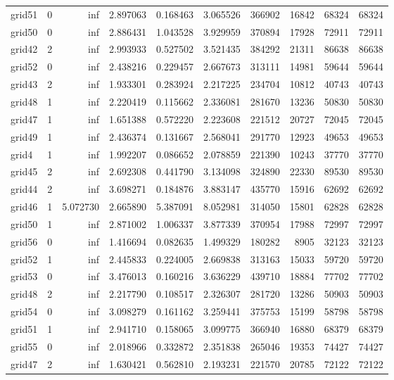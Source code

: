 \documentclass[../../../thesis.tex]{subfiles}
\begin{document}
\begin{longtable}{|l|r|r|r|r|r|r|r|r|r|}
grid51 & 0 & inf & 2.897063 & 0.168463 & 3.065526 & 366902 & 16842 & 68324 & 68324 \\
grid50 & 0 & inf & 2.886431 & 1.043528 & 3.929959 & 370894 & 17928 & 72911 & 72911 \\
grid42 & 2 & inf & 2.993933 & 0.527502 & 3.521435 & 384292 & 21311 & 86638 & 86638 \\
grid52 & 0 & inf & 2.438216 & 0.229457 & 2.667673 & 313111 & 14981 & 59644 & 59644 \\
grid43 & 2 & inf & 1.933301 & 0.283924 & 2.217225 & 234704 & 10812 & 40743 & 40743 \\
grid48 & 1 & inf & 2.220419 & 0.115662 & 2.336081 & 281670 & 13236 & 50830 & 50830 \\
grid47 & 1 & inf & 1.651388 & 0.572220 & 2.223608 & 221512 & 20727 & 72045 & 72045 \\
grid49 & 1 & inf & 2.436374 & 0.131667 & 2.568041 & 291770 & 12923 & 49653 & 49653 \\
grid4 & 1 & inf & 1.992207 & 0.086652 & 2.078859 & 221390 & 10243 & 37770 & 37770 \\
grid45 & 2 & inf & 2.692308 & 0.441790 & 3.134098 & 324890 & 22330 & 89530 & 89530 \\
grid44 & 2 & inf & 3.698271 & 0.184876 & 3.883147 & 435770 & 15916 & 62692 & 62692 \\
grid46 & 1 & 5.072730 & 2.665890 & 5.387091 & 8.052981 & 314050 & 15801 & 62828 & 62828 \\
grid50 & 1 & inf & 2.871002 & 1.006337 & 3.877339 & 370954 & 17988 & 72997 & 72997 \\
grid56 & 0 & inf & 1.416694 & 0.082635 & 1.499329 & 180282 & 8905 & 32123 & 32123 \\
grid52 & 1 & inf & 2.445833 & 0.224005 & 2.669838 & 313163 & 15033 & 59720 & 59720 \\
grid53 & 0 & inf & 3.476013 & 0.160216 & 3.636229 & 439710 & 18884 & 77702 & 77702 \\
grid48 & 2 & inf & 2.217790 & 0.108517 & 2.326307 & 281720 & 13286 & 50903 & 50903 \\
grid54 & 0 & inf & 3.098279 & 0.161162 & 3.259441 & 375753 & 15199 & 58798 & 58798 \\
grid51 & 1 & inf & 2.941710 & 0.158065 & 3.099775 & 366940 & 16880 & 68379 & 68379 \\
grid55 & 0 & inf & 2.018966 & 0.332872 & 2.351838 & 265046 & 19353 & 74427 & 74427 \\
grid47 & 2 & inf & 1.630421 & 0.562810 & 2.193231 & 221570 & 20785 & 72122 & 72122 \\

\end{longtable}
\end{document}
